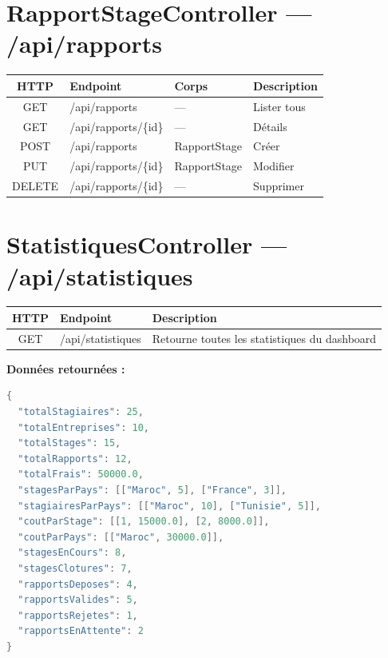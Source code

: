 \documentclass[12pt,a4paper]{report}
\begin{document}
\section{RapportStageController --- /api/rapports}

\begin{table}[H]
\centering
\begin{tabular}{|c|l|l|p{4cm}|}
\hline
\textbf{HTTP} & \textbf{Endpoint} & \textbf{Corps} & \textbf{Description} \\ \hline
GET & /api/rapports & --- & Lister tous \\ \hline
GET & /api/rapports/\{id\} & --- & Détails \\ \hline
POST & /api/rapports & RapportStage & Créer \\ \hline
PUT & /api/rapports/\{id\} & RapportStage & Modifier \\ \hline
DELETE & /api/rapports/\{id\} & --- & Supprimer \\ \hline
\end{tabular}
\end{table}

\section{StatistiquesController --- /api/statistiques}

\begin{table}[H]
\centering
\begin{tabular}{|c|l|p{8cm}|}
\hline
\textbf{HTTP} & \textbf{Endpoint} & \textbf{Description} \\ \hline
GET & /api/statistiques & Retourne toutes les statistiques du dashboard \\ \hline
\end{tabular}
\end{table}

\textbf{Données retournées :}
\begin{lstlisting}[language=Java, caption=Structure JSON de la réponse statistiques]
{
  "totalStagiaires": 25,
  "totalEntreprises": 10,
  "totalStages": 15,
  "totalRapports": 12,
  "totalFrais": 50000.0,
  "stagesParPays": [["Maroc", 5], ["France", 3]],
  "stagiairesParPays": [["Maroc", 10], ["Tunisie", 5]],
  "coutParStage": [[1, 15000.0], [2, 8000.0]],
  "coutParPays": [["Maroc", 30000.0]],
  "stagesEnCours": 8,
  "stagesClotures": 7,
  "rapportsDeposes": 4,
  "rapportsValides": 5,
  "rapportsRejetes": 1,
  "rapportsEnAttente": 2
}
\end{lstlisting}
\end{document}
